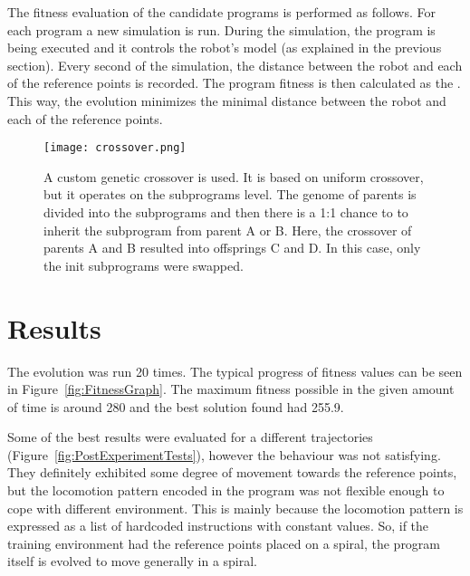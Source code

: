 \documentclass{ExcelAtFIT}
\begin{document}
The fitness evaluation of the candidate programs is performed as follows.
For each program a new simulation is run.
During the simulation, the program is being executed and it controls the robot's model (as explained in the previous section).
Every second of the simulation, the distance between the robot and each of the reference points is recorded.
The program fitness is then calculated as the .
This way, the evolution minimizes the minimal distance between the robot and each of the reference points.


\begin{figure}[t]
	\centering
	{\texttt{[image: crossover.png]}}
	\caption{
	A custom genetic crossover is used.
	It is based on uniform crossover, but it operates on the subprograms level.
	The genome of parents is divided into the subprograms and then there is a 1:1 chance to to inherit the subprogram from parent A or B.
	Here, the crossover of parents A and B resulted into offsprings C and D.
	In this case, only the init subprograms were swapped.
	}
	\label{fig:Crossover}
\end{figure}




\section{Results}
The evolution was run 20 times.
The typical progress of fitness values can be seen in Figure~\ref{fig:FitnessGraph}.
The maximum fitness possible in the given amount of time is around 280 and the best solution found had 255.9.

Some of the best results were evaluated for a different trajectories (Figure~\ref{fig:PostExperimentTests}), however the behaviour was not satisfying.
They definitely exhibited some degree of movement towards the reference points, but the locomotion pattern encoded in the program was not flexible enough to cope with different environment.
This is mainly because the locomotion pattern is expressed as a list of hardcoded instructions with constant values.
So, if the training environment had the reference points placed on a spiral, the program itself is evolved to move generally in a spiral.
\end{document}
